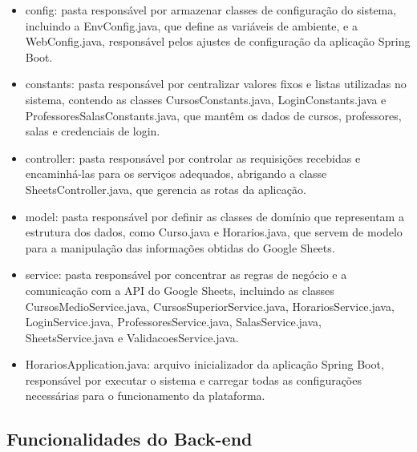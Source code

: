 \begin{itemize}
    \item config: pasta responsável por armazenar classes de configuração do sistema, incluindo a EnvConfig.java, que define as variáveis de ambiente, e a WebConfig.java, responsável pelos ajustes de configuração da aplicação Spring Boot.
    \item constants: pasta responsável por centralizar valores fixos e listas utilizadas no sistema, contendo as classes CursosConstants.java, LoginConstants.java e ProfessoresSalasConstants.java, que mantêm os dados de cursos, professores, salas e credenciais de login.
    \item controller: pasta responsável por controlar as requisições recebidas e encaminhá-las para os serviços adequados, abrigando a classe SheetsController.java, que gerencia as rotas da aplicação.
    \item model: pasta responsável por definir as classes de domínio que representam a estrutura dos dados, como Curso.java e Horarios.java, que servem de modelo para a manipulação das informações obtidas do Google Sheets.
    \item service: pasta responsável por concentrar as regras de negócio e a comunicação com a API do Google Sheets, incluindo as classes CursosMedioService.java, CursosSuperiorService.java, HorariosService.java, LoginService.java, ProfessoresService.java, SalasService.java, SheetsService.java e ValidacoesService.java.
    \item HorariosApplication.java: arquivo inicializador da aplicação Spring Boot, responsável por executar o sistema e carregar todas as configurações necessárias para o funcionamento da plataforma.
\end{itemize}

\subsection{Funcionalidades do Back-end}

